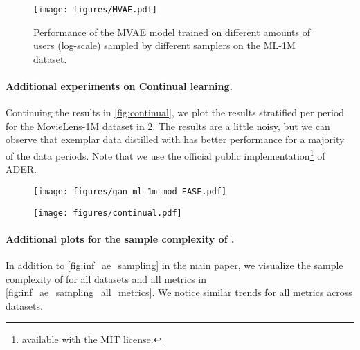 \documentclass{article}
\begin{document}
\begin{figure}[ht!] 
    \texttt{[image: figures/MVAE.pdf]}
    \caption{Performance of the MVAE model trained on different amounts of users (log-scale) sampled by different samplers on the ML-1M dataset.}
    \label{fig:mvae_sampling}
\end{figure}

\paragraph{Additional experiments on Continual learning.} Continuing the results in \cref{fig:continual}, we plot the results stratified per period for the MovieLens-1M dataset in \cref{fig:continual_per_day}. The results are a little noisy, but we can observe that exemplar data distilled with \sampler has better performance for a majority of the data periods. Note that we use the official public implementation\footnote{\href{https://github.com/doublemul/ADER}{\color{blue}{https://github.com/doublemul/ADER}} available with the MIT license.} of \textsc{ADER}.

\begin{figure}[ht!]
\centering
\begin{minipage}{.48\textwidth}
  \centering
  \texttt{[image: figures/gan\_ml-1m-mod\_EASE.pdf]}
  \label{fig:arcf}
\end{minipage} \hfill
\begin{minipage}{.48\textwidth}
  \centering
  \texttt{[image: figures/continual.pdf]}
  \label{fig:continual_per_day}
\end{minipage}
\end{figure}

\paragraph{Additional plots for the sample complexity of \model.} In addition to \cref{fig:inf_ae_sampling} in the main paper, we visualize the sample complexity of \model for all datasets and all metrics in \cref{fig:inf_ae_sampling_all_metrics}. We notice similar trends for all metrics across datasets.
\end{document}
